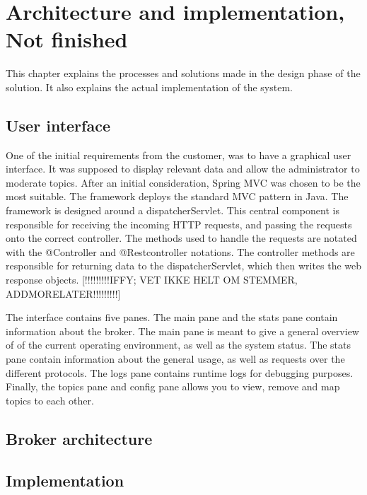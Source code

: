 
\chapter{Architecture and implementation, Not finished}

This chapter explains the processes and solutions made in the design phase of the solution. It also explains the actual implementation of the system.

\section{User interface}

One of the initial requirements from the customer, was to have a graphical user interface. It was supposed to display relevant data and allow the administrator to moderate topics. After an initial consideration, Spring MVC was chosen to be the most suitable. The framework deploys the standard MVC pattern in Java. The framework is designed around a dispatcherServlet. This central component is responsible for receiving the incoming HTTP requests, and passing the requests onto the correct controller. The methods used to handle the requests are notated with the @Controller and @Restcontroller notations. The controller methods are responsible for returning data to the dispatcherServlet, which then writes the web response objects.  [!!!!!!!!!IFFY; VET IKKE HELT OM STEMMER, ADDMORELATER!!!!!!!!!]

The interface contains five panes. The main pane and the stats pane contain information about the broker. The main pane is meant to give a general overview of of the current operating environment, as well as the system status. The stats pane contain information about the general usage, as well as requests over the different protocols. The logs pane contains runtime logs for debugging purposes. Finally, the topics pane and config pane allows you to view, remove and map topics to each other.

\section{Broker architecture}

\section{Implementation}

